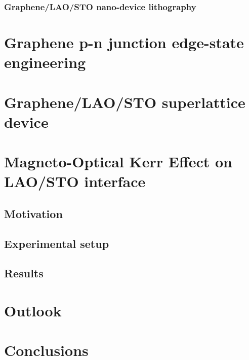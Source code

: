 \documentclass[pdflatex, sectionletters, 12pt]{pittetd}    %
\begin{document}
\subsection{Graphene/LAO/STO nano-device lithography}

\chapter{Graphene p-n junction edge-state engineering}

\chapter{Graphene/LAO/STO superlattice device}

\chapter{Magneto-Optical Kerr Effect on LAO/STO interface}

\section{Motivation}

\section{Experimental setup}

\section{Results}

\chapter{Outlook}
	
\chapter{Conclusions}


%

%
% 

\end{document}
